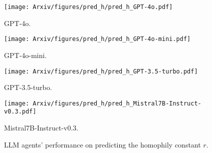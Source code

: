 \begin{figure*}[h]
    \centering
    \hfill
    \begin{minipage}{0.23\textwidth}
    \captionsetup{labelformat=empty}
        \centering
        \texttt{[image: Arxiv/figures/pred\_h/pred\_h\_GPT-4o.pdf]}
        \vspace{-0.8cm}
        \caption*{\scriptsize GPT-4o.}
    \end{minipage}
    \hfill
    \begin{minipage}{0.23\textwidth}
    \captionsetup{labelformat=empty}
        \centering
        \texttt{[image: Arxiv/figures/pred\_h/pred\_h\_GPT-4o-mini.pdf]}
        \vspace{-0.8cm}
        \caption*{\scriptsize GPT-4o-mini.}
    \end{minipage}
    \begin{minipage}{0.23\textwidth}
    \captionsetup{labelformat=empty}
        \centering
        \texttt{[image: Arxiv/figures/pred\_h/pred\_h\_GPT-3.5-turbo.pdf]}
        \vspace{-0.8cm}
        \caption*{\scriptsize GPT-3.5-turbo.}
    \end{minipage}
    \begin{minipage}{0.23\textwidth}
    \captionsetup{labelformat=empty}
        \centering
        \texttt{[image: Arxiv/figures/pred\_h/pred\_h\_Mistral7B-Instruct-v0.3.pdf]}
        \vspace{-0.8cm}
        \caption*{\scriptsize Mistral7B-Instruct-v0.3.}
    \end{minipage}
    \vspace{-0.cm}
    \caption{LLM agents' performance on predicting the homophily constant $r$.}
    \label{fig:predict_h_more}
\end{figure*}